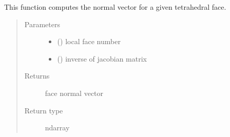 \documentclass[letterpaper,10pt,english]{sphinxmanual}
\begin{document}
\begin{fulllineitems}
\label{\detokenize{petgem/hvfem:petgem.hvfem.getNormalVector}}
This function computes the normal vector for a given tetrahedral face.
\begin{quote}\begin{description}
\item[{Parameters}] \leavevmode\begin{itemize}
\item {} 
 () \textendash{} local face number

\item {} 
 () \textendash{} inverse of jacobian matrix

\end{itemize}

\item[{Returns}] \leavevmode
face normal vector

\item[{Return type}] \leavevmode
ndarray

\end{description}\end{quote}

\end{fulllineitems}

\end{document}
